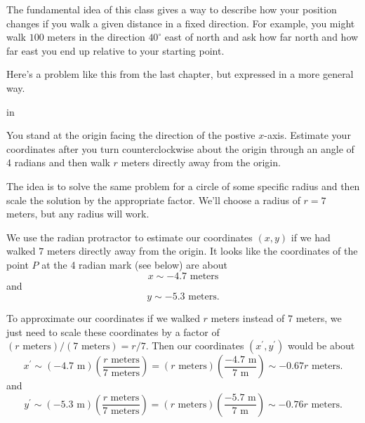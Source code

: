 \documentclass{ximera}
\newcommand{\pskip}{\vskip 0.1 in}
\begin{document}
The fundamental idea of this class gives a way to describe how your position changes if you walk a given distance in a fixed direction. For example, you might walk $100$ meters in the direction $40^\circ$ east of north and ask how far north and how far east you end up relative to your starting point.

Here's a problem like this from the last chapter, but expressed in a more general way.

\pskip

\begin{question} \label{Q2435r6:Cosine}

You stand at the origin facing the direction of the postive $x$-axis. Estimate your coordinates after you turn counterclockwise about the origin through an angle of 4 radians and then walk $r$ meters directly away from the origin.

\begin{explanation}
The idea is to solve the same problem for a circle of some specific radius and then scale the solution by the appropriate factor. We'll choose a radius of $r=7$ meters, but any radius will work.

We use the radian protractor to estimate our coordinates $(x, y)$ if we had walked $7$ meters directly away from the origin.  It looks like the coordinates of the point $P$ at the 4 radian mark (see below) are about 
\[
   x\sim -4.7 \text{ meters}
\]
and 
\[
  y\sim -5.3 \text{ meters}.
\]

To approximate our coordinates if we walked $r$ meters instead of $7$ meters, we just need to scale these coordinates by a factor of $(r\text{ meters})/(7\text{ meters}) = r/7$. Then our coordinates $(x^\prime,y^\prime)$ would be about
\[
   x^\prime \sim (-4.7\text{ m}) \left( \frac{r\text{ meters}}{7\text{ meters}} \right) = (r \text{ meters})\left( \frac{-4.7\text{ m}}{7\text{ m}}\right) \sim  -0.67r   \text{ meters}.
\]
and
\[
   y^\prime   \sim (-5.3\text{ m}) \left( \frac{r\text{ meters}}{7\text{ meters}} \right) = (r \text{ meters})\left( \frac{-5.7\text{ m}}{7\text{ m}}\right) \sim   -0.76 r \text{ meters}.
\]

 
\begin{onlineOnly}
    \begin{center}
\end{center}
\end{onlineOnly}
\end{explanation}


\end{question}
\end{document}
